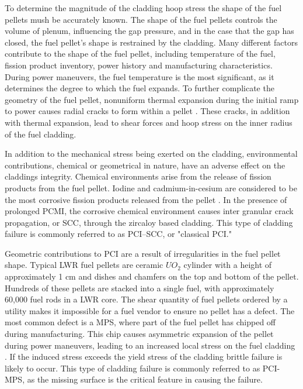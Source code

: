 \documentclass[edeposit,fullpage,11pt]{uiucthesis2009}
\begin{document}
To determine the magnitude of the cladding hoop stress the shape of the fuel pellets mush be accurately known.
The shape of the fuel pellets controls the volume of plenum, influencing the gap pressure, and in the case that the gap has closed, the fuel pellet's shape is restrained by the cladding. 
Many different factors contribute to the shape of the fuel pellet, including temperature of the fuel, fission product inventory, power history and manufacturing characteristics.
During power maneuvers, the fuel temperature is the most significant, as it determines the degree to which the fuel expands.
To further complicate the geometry of the fuel pellet, nonuniform thermal expansion during the initial ramp to power causes radial cracks to form within a pellet \cite{capps_evaluation_2016}.
These cracks, in addition with thermal expansion, lead to shear forces and hoop stress on the inner radius of the fuel cladding.
  
In addition to the mechanical stress being exerted on the cladding, environmental contributions, chemical or geometrical in nature, have an adverse effect on the claddings integrity.
Chemical environments arise from the release of fission products from the fuel pellet.
Iodine and cadmium-in-cesium are considered to be the most corrosive fission products released from the pellet \cite{capps_evaluation_2016}. 
In the presence of prolonged \gls{PCMI}, the corrosive chemical environment causes inter granular crack propagation, or \gls{SCC}, through the zircaloy based cladding.
This type of cladding failure is commonly referred to as \gls{PCI}--\gls{SCC}, or "classical \gls{PCI}."

Geometric contributions to \gls{PCI} are a result of irregularities in the fuel pellet shape.
Typical \gls{LWR} fuel pellets are ceramic $UO_2$ cylinder with a height of approximately 1 cm and dishes and chamfers on the top and bottom of the pellet.
Hundreds of these pellets are stacked into a single fuel, with approximately 60,000 fuel rods in a \gls{LWR} core.
The shear quantity of fuel pellets ordered by a utility makes it impossible for a fuel vendor to ensure no pellet has a defect.
The most common defect is a \gls{MPS}, where part of the fuel pellet has chipped off during manufacturing.
This chip causes asymmetric expansion of the pellet during power maneuvers, leading to an increased local stress on the fuel cladding \cite{capps_evaluation_2016}. 
If the induced stress exceeds the yield stress of the cladding brittle failure is likely to occur.
This type of cladding failure is commonly referred to as \gls{PCI}-\gls{MPS}, as the missing surface is the critical feature in causing the failure.
\end{document}
